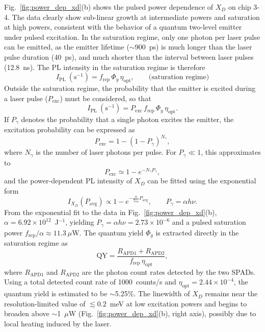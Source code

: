 Fig.~\ref{fig:power_dep_xd}(b) shows the pulsed power dependence of $X_D$ on chip 3-4. The data clearly show sub-linear growth at intermediate powers and saturation at high powers, consistent with the behavior of a quantum two-level emitter under pulsed excitation. In the saturation regime, only one photon per laser pulse can be emitted, as the emitter lifetime ($\sim$900~ps) is much longer than the laser pulse duration (40~ps), and much shorter than the interval between laser pulses (12.8~ns). The PL intensity in the saturation regime is therefore
\begin{equation}
I_{\mathrm{PL}}\ (\mathrm{s}^{-1}) = f_{\mathrm{rep}}\, \Phi_y\, \eta_{\mathrm{opt}}, \qquad \text{(saturation regime)}
\end{equation}
Outside the saturation regime, the probability that the emitter is excited during a laser pulse ($P_{\mathrm{exc}}$) must be considered, so that
\begin{equation}
I_{\mathrm{PL}}\ (\mathrm{s}^{-1}) = P_{\mathrm{exc}}\, f_{\mathrm{rep}}\, \Phi_y\, \eta_{\mathrm{opt}}.
\end{equation}
If $P_\gamma$ denotes the probability that a single photon excites the emitter, the excitation probability can be expressed as
\begin{equation}
P_{\mathrm{exc}} = 1 - (1 - P_\gamma)^{N_\gamma},
\end{equation}
where $N_\gamma$ is the number of laser photons per pulse. For $P_\gamma \ll 1$, this approximates to
\begin{equation}
P_{\mathrm{exc}} \simeq 1 - e^{-N_\gamma P_\gamma},
\end{equation}
and the power-dependent PL intensity of $X_D$ can be fitted using the exponential form
\begin{equation}
I_{X_D}(P_{\mathrm{avg}}) \propto 1 - e^{-\frac{\alpha}{f_{\mathrm{rep}}} P_{\mathrm{avg}}}, \qquad P_\gamma = \alpha h\nu.
\label{eq:saturation}
\end{equation}
From the exponential fit to the data in Fig.~\ref{fig:power_dep_xd}(b), $\alpha = 6.92 \times 10^{12}$~J$^{-1}$, yielding $P_\gamma = \alpha h\nu = 2.73 \times 10^{-6}$ and a pulsed saturation power $f_{\mathrm{rep}}/\alpha \approx 11.3~\mu$W. The quantum yield $\Phi_y$ is extracted directly in the saturation regime as
\begin{equation}
\mathrm{QY} = \frac{R_{\mathrm{APD1}} + R_{\mathrm{APD2}}}{f_{\mathrm{rep}}\, \eta_{\mathrm{opt}}},
\end{equation}
where $R_{\mathrm{APD1}}$ and $R_{\mathrm{APD2}}$ are the photon count rates detected by the two SPADs. Using a total detected count rate of 1000~counts/s and $\eta_{\mathrm{opt}} = 2.44 \times 10^{-4}$, the quantum yield is estimated to be $\sim$5.25\%. The linewidth of $X_D$ remains near the resolution-limited value of $\lesssim 0.2$~meV at low excitation powers and begins to broaden above $\sim$1~$\mu$W (Fig.~\ref{fig:power_dep_xd}(b), right axis), possibly due to local heating induced by the laser.

